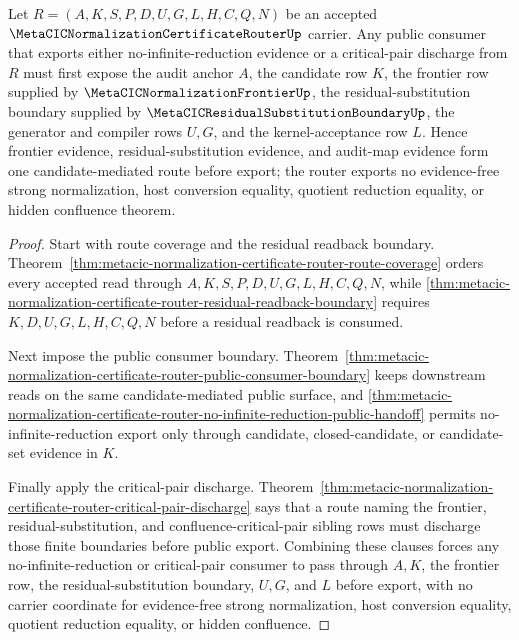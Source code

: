 \begin{theorem}
\label{thm:metacic-normalization-certificate-router-frontier-residual-audit-handoff}
Let $R=(A,K,S,P,D,U,G,L,H,C,Q,N)$ be an accepted $\MetaCICNormalizationCertificateRouterUp$ carrier. Any public consumer that exports either no-infinite-reduction evidence or a critical-pair discharge from $R$ must first expose the audit anchor $A$, the candidate row $K$, the frontier row supplied by $\MetaCICNormalizationFrontierUp$, the residual-substitution boundary supplied by $\MetaCICResidualSubstitutionBoundaryUp$, the generator and compiler rows $U,G$, and the kernel-acceptance row $L$. Hence frontier evidence, residual-substitution evidence, and audit-map evidence form one candidate-mediated route before export; the router exports no evidence-free strong normalization, host conversion equality, quotient reduction equality, or hidden confluence theorem.
\end{theorem}
\begin{proof}
Start with route coverage and the residual readback boundary. Theorem~\ref{thm:metacic-normalization-certificate-router-route-coverage} orders every accepted read through $A,K,S,P,D,U,G,L,H,C,Q,N$, while \autoref{thm:metacic-normalization-certificate-router-residual-readback-boundary} requires $K,D,U,G,L,H,C,Q,N$ before a residual readback is consumed.

Next impose the public consumer boundary. Theorem~\ref{thm:metacic-normalization-certificate-router-public-consumer-boundary} keeps downstream reads on the same candidate-mediated public surface, and \autoref{thm:metacic-normalization-certificate-router-no-infinite-reduction-public-handoff} permits no-infinite-reduction export only through candidate, closed-candidate, or candidate-set evidence in $K$.

Finally apply the critical-pair discharge. Theorem~\ref{thm:metacic-normalization-certificate-router-critical-pair-discharge} says that a route naming the frontier, residual-substitution, and confluence-critical-pair sibling rows must discharge those finite boundaries before public export. Combining these clauses forces any no-infinite-reduction or critical-pair consumer to pass through $A,K$, the frontier row, the residual-substitution boundary, $U,G$, and $L$ before export, with no carrier coordinate for evidence-free strong normalization, host conversion equality, quotient reduction equality, or hidden confluence.
\end{proof}


